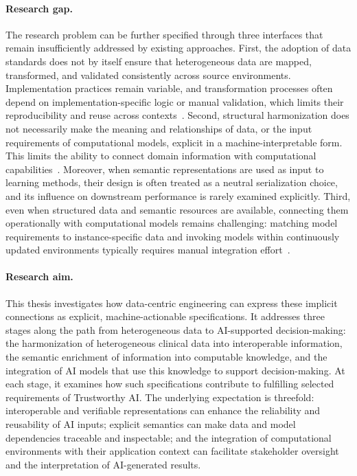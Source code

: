 \paragraph{Research gap.}
The research problem can be further specified through three interfaces that remain insufficiently addressed by existing approaches. First, the adoption of data standards does not by itself ensure that heterogeneous data are mapped, transformed, and validated consistently across source environments. Implementation practices remain variable, and transformation processes often depend on implementation-specific logic or manual validation, which limits their reproducibility and reuse across contexts~\cite{oecd_interoperability_2026,williams2023standardized,simon2024metadata}. Second, structural harmonization does not necessarily make the meaning and relationships of data, or the input requirements of computational models, explicit in a machine-interpretable form. This limits the ability to connect domain information with computational capabilities~\cite{rathee_semantic_2025,xhani_role_2025}. Moreover, when semantic representations are used as input to learning methods, their design is often treated as a neutral serialization choice, and its influence on downstream performance is rarely examined explicitly. Third, even when structured data and semantic resources are available, connecting them operationally with computational models remains challenging: matching model requirements to instance-specific data and invoking models within continuously updated environments typically requires manual integration effort~\cite{felicetti_knowledge_2025,Katsoulakis2024}.

\paragraph{Research aim.}
This thesis investigates how data-centric engineering can express these implicit connections as explicit, machine-actionable specifications. It addresses three stages along the path from heterogeneous data to AI-supported decision-making: the harmonization of heterogeneous clinical data into interoperable information, the semantic enrichment of information into computable knowledge, and the integration of AI models that use this knowledge to support decision-making. At each stage, it examines how such specifications contribute to fulfilling selected requirements of Trustworthy AI. The underlying expectation is threefold: interoperable and verifiable representations can enhance the reliability and reusability of AI inputs; explicit semantics can make data and model dependencies traceable and inspectable; and the integration of computational environments with their application context can facilitate stakeholder oversight and the interpretation of AI-generated results.


